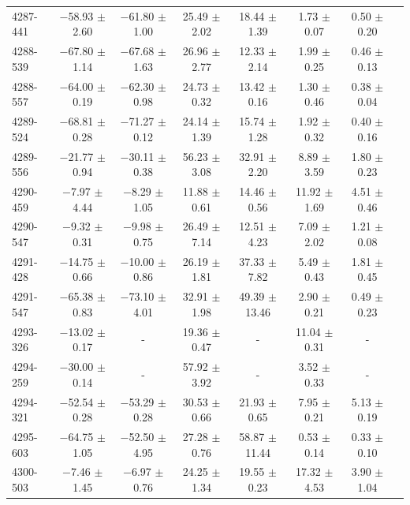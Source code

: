 \documentclass[a4paper,fleqn,usenatbib]{mnras}     %
\begin{document}
\begin{longtable}{l c c c c c c c }
4287-441   &   $-$58.93 $\pm$ 2.60   &   $-$61.80 $\pm$ 1.00   &    25.49 $\pm$ 2.02   &  18.44 $\pm$ 1.39   &   1.73 $\pm$ 0.07   &   0.50 $\pm$ 0.20  \\
4288-539   &   $-$67.80 $\pm$ 1.14   &   $-$67.68 $\pm$ 1.63   &    26.96 $\pm$ 2.77   &  12.33 $\pm$ 2.14   &   1.99 $\pm$ 0.25   &   0.46 $\pm$ 0.13  \\
4288-557   &   $-$64.00 $\pm$ 0.19   &   $-$62.30 $\pm$ 0.98   &    24.73 $\pm$ 0.32   &  13.42 $\pm$ 0.16   &   1.30 $\pm$ 0.46   &   0.38 $\pm$ 0.04  \\
4289-524   &   $-$68.81 $\pm$ 0.28   &   $-$71.27 $\pm$ 0.12   &    24.14 $\pm$ 1.39   &  15.74 $\pm$ 1.28   &   1.92 $\pm$ 0.32   &   0.40 $\pm$ 0.16  \\
4289-556   &   $-$21.77 $\pm$ 0.94   &   $-$30.11 $\pm$ 0.38   &    56.23 $\pm$ 3.08   &  32.91 $\pm$ 2.20   &   8.89 $\pm$ 3.59   &   1.80 $\pm$ 0.23  \\
4290-459   &    $-$7.97 $\pm$ 4.44   &    $-$8.29 $\pm$ 1.05   &    11.88 $\pm$ 0.61   &  14.46 $\pm$ 0.56   &  11.92 $\pm$ 1.69   &   4.51 $\pm$ 0.46  \\
4290-547   &    $-$9.32 $\pm$ 0.31   &    $-$9.98 $\pm$ 0.75   &    26.49 $\pm$ 7.14   &  12.51 $\pm$ 4.23   &   7.09 $\pm$ 2.02   &   1.21 $\pm$ 0.08  \\
4291-428   &   $-$14.75 $\pm$ 0.66   &   $-$10.00 $\pm$ 0.86   &    26.19 $\pm$ 1.81   &  37.33 $\pm$ 7.82   &   5.49 $\pm$ 0.43   &   1.81 $\pm$ 0.45  \\
4291-547   &   $-$65.38 $\pm$ 0.83   &   $-$73.10 $\pm$ 4.01   &    32.91 $\pm$ 1.98   &  49.39 $\pm$13.46   &   2.90 $\pm$ 0.21   &   0.49 $\pm$ 0.23  \\
4293-326   &   $-$13.02 $\pm$ 0.17   &     -   &    19.36 $\pm$ 0.47   &   -   &  11.04 $\pm$ 0.31   &   -  \\
4294-259   &   $-$30.00 $\pm$ 0.14   &     -   &    57.92 $\pm$ 3.92   &   -   &   3.52 $\pm$ 0.33   &   -  \\
4294-321   &   $-$52.54 $\pm$ 0.28   &   $-$53.29 $\pm$ 0.28   &    30.53 $\pm$ 0.66   &  21.93 $\pm$ 0.65   &   7.95 $\pm$ 0.21   &   5.13 $\pm$ 0.19  \\
4295-603   &   $-$64.75 $\pm$ 1.05   &   $-$52.50 $\pm$ 4.95   &    27.28 $\pm$ 0.76   &  58.87 $\pm$11.44   &   0.53 $\pm$ 0.14   &   0.33 $\pm$ 0.10  \\
4300-503   &    $-$7.46 $\pm$ 1.45   &    $-$6.97 $\pm$ 0.76   &    24.25 $\pm$ 1.34   &  19.55 $\pm$ 0.23   &  17.32 $\pm$ 4.53   &   3.90 $\pm$ 1.04  \\

\end{longtable}
\end{document}
